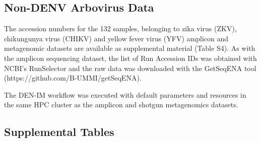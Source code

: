 \subsection{Non-DENV Arbovirus Data} \label{chap4_sup_non_denv}

The accession numbers for the 132 samples, belonging to zika virus (ZKV), chikungunya virus (CHIKV) and yellow fever virus (YFV) amplicon and metagenomic datasets are available as supplemental material (Table S4). As with the amplicon sequencing dataset, the list of Run Accession IDs was obtained with NCBI’s RunSelector and the raw data was downloaded with the GetSeqENA tool (https://github.com/B-UMMI/getSeqENA). 

The DEN-IM workflow was executed with default parameters and resources in the same HPC cluster as the amplicon and shotgun metagenomics datasets.

\subsection{Supplemental Tables} \label{chap4_sup_tables}

